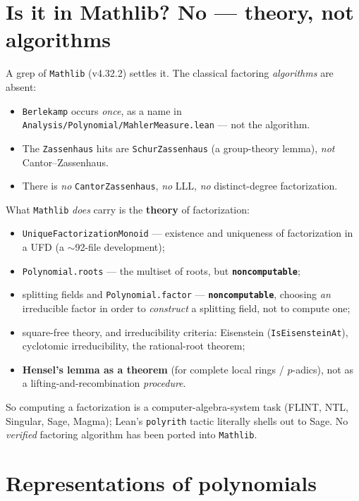 \documentclass[11pt]{article}
\newcommand{\code}[1]{\texttt{#1}}
\begin{document}
\section{Is it in Mathlib? No --- theory, not algorithms}

A grep of \code{Mathlib} (v4.32.2) settles it. The classical factoring
\emph{algorithms} are absent:
\begin{itemize}[leftmargin=*]
  \item \code{Berlekamp} occurs \emph{once}, as a name in
        \code{Analysis/Polynomial/MahlerMeasure.lean} --- not the algorithm.
  \item The \code{Zassenhaus} hits are \code{SchurZassenhaus} (a group-theory
        lemma), \emph{not} Cantor--Zassenhaus.
  \item There is \emph{no} \code{CantorZassenhaus}, \emph{no} LLL, \emph{no}
        distinct-degree factorization.
\end{itemize}

What \code{Mathlib} \emph{does} carry is the \textbf{theory} of factorization:
\begin{itemize}[leftmargin=*]
  \item \code{UniqueFactorizationMonoid} --- existence and uniqueness of
        factorization in a UFD (a $\sim$92-file development);
  \item \code{Polynomial.roots} --- the multiset of roots, but
        \textbf{\code{noncomputable}};
  \item splitting fields and \code{Polynomial.factor} ---
        \textbf{\code{noncomputable}}, choosing \emph{an} irreducible factor in
        order to \emph{construct} a splitting field, not to compute one;
  \item square-free theory, and irreducibility criteria: Eisenstein
        (\code{IsEisensteinAt}), cyclotomic irreducibility, the rational-root
        theorem;
  \item \textbf{Hensel's lemma as a theorem} (for complete local rings /
        $p$-adics), not as a lifting-and-recombination \emph{procedure}.
\end{itemize}

So computing a factorization is a computer-algebra-system task
(FLINT, NTL, Singular, Sage, Magma); Lean's \code{polyrith} tactic literally
shells out to Sage. No \emph{verified} factoring algorithm has been ported into
\code{Mathlib}.

\section{Representations of polynomials}
\end{document}
